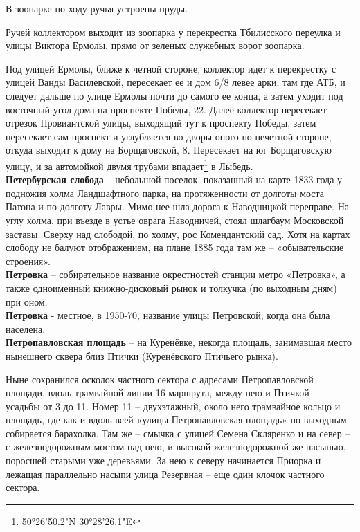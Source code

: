 В зоопарке по ходу ручья устроены пруды.

Ручей коллектором выходит из зоопарка у перекрестка Тбилисского переулка и улицы Виктора Ермолы, прямо от зеленых служебных ворот зоопарка.

Под улицей Ермолы, ближе к четной стороне, коллектор идет к перекрестку с улицей Ванды Василевской, пересекает ее и дом 6/8 левее арки, там где АТБ, и следует дальше по улице Ермолы почти до самого ее конца, а затем уходит под восточный угол дома на проспекте Победы, 22. Далее коллектор пересекает отрезок Провиантской улицы, выходящий тут к проспекту Победы, затем пересекает сам проспект и углубляется во дворы оного по нечетной стороне, откуда выходит к дому на Борщаговской, 8. Пересекает на юг Борщаговскую улицу, и за автомойкой двумя трубами впадает\footnote{50°26'50.2"N 30°28'26.1"E} в Лыбедь.\\

\textbf{Петербурская слобода} – небольшой поселок, показанный на карте 1833 года у подножия холма Ландшафтного парка, на протяженности от долготы моста Патона и по долготу Лавры. Мимо нее шла дорога к Наводницкой переправе. На углу холма, при въезде в устье оврага Наводничей, стоял шлагбаум Московской заставы. Сверху над слободой, по холму, рос Комендантский сад. Хотя на картах слободу не балуют отображением, на плане 1885 года там же – «обывательские строения».\\

\textbf{Петровка} – собирательное название окрестностей станции метро «Петровка», а также одноименный книжно-дисковый рынок и толкучка (по выходным дням) при оном.\\

\textbf{Петровка} - местное, в 1950-70, название улицы Петровской, когда она была населена.\\

\textbf{Петропавловская площадь} – на Куренёвке, некогда площадь, занимавшая место нынешнего сквера близ Птички (Куренёвского Птичьего рынка). 

Ныне сохранился осколок частного сектора с адресами Петропавловской площади, вдоль трамвайной линии 16 маршрута, между нею и Птичкой – усадьбы от 3 до 11. Номер 11 – двухэтажный, около него трамвайное кольцо и площадь, где как и вдоль всей «улицы Петропавловская площадь» по выходным собирается барахолка. Там же – смычка с улицей Семена Скляренко и на север – с железнодорожным мостом над нею, и высокой железнодорожной же насыпью, поросшей старыми уже деревьями. За нею к северу начинается Приорка и лежащая параллельно насыпи улица Резервная – еще один клочок частного сектора.\\

